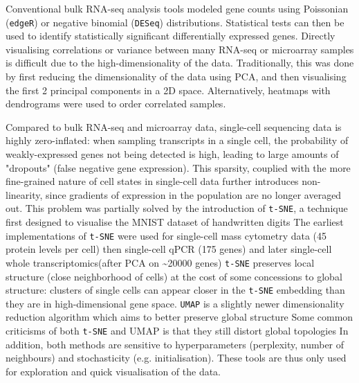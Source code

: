 Conventional bulk RNA-seq analysis tools modeled gene counts using Poissonian (\verb|edgeR|) or negative binomial (\verb|DESeq|) distributions. Statistical tests can then be used to identify statistically significant differentially expressed genes. Directly visualising correlations or variance between many RNA-seq or microarray samples is difficult due to the high-dimensionality of the data. Traditionally, this was done by first reducing the dimensionality of the data using PCA, and then visualising the first 2 principal components in a 2D space. Alternatively, heatmaps with dendrograms were used to order correlated samples.

Compared to bulk RNA-seq and microarray data, single-cell sequencing data is highly zero-inflated: when sampling transcripts in a single cell, the probability of weakly-expressed genes not being detected is high, leading to large amounts of "dropouts" (false negative gene expression). This sparsity, couplied with the more fine-grained nature of cell states in single-cell data further introduces non-linearity, since gradients of expression in the population are no longer averaged out. This problem was partially solved by the introduction of \verb|t-SNE|, a technique first designed to visualise the MNIST dataset of handwritten digits The earliest implementations of \verb|t-SNE| were used for single-cell mass cytometry data (45 protein levels per cell) then single-cell qPCR (175 genes) and later single-cell whole transcriptomics(after PCA on \textasciitilde{\num{20000}} genes) \verb|t-SNE| preserves local structure (close neighborhood of cells) at the cost of some concessions to global structure: clusters of single cells can appear closer in the \verb|t-SNE| embedding than they are in high-dimensional gene space. \verb|UMAP| is a slightly newer dimensionality reduction algorithm which aims to better preserve global structure Some common criticisms of both \verb|t-SNE| and UMAP is that they still distort global topologies In addition, both methods are sensitive to hyperparameters (perplexity, number of neighbours) and stochasticity (e.g. initialisation). These tools are thus only used for exploration and quick visualisation of the data.

